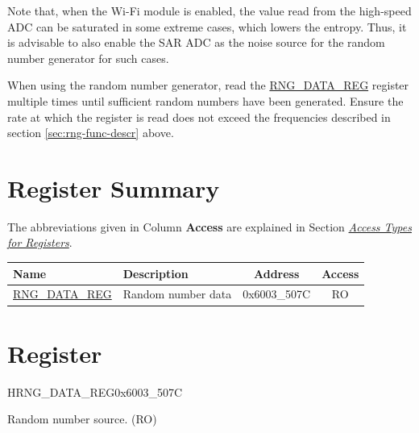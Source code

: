 \documentclass[main\_\_EN.tex]{subfiles}
\begin{document}
\begin{tiplisting}
Note that, when the Wi-Fi module is enabled, the value read from the high-speed ADC can be saturated in some extreme cases, which lowers the entropy. Thus, it is advisable to also enable the SAR ADC as the noise source for the random number generator for such cases.
\end{tiplisting}

When using the random number generator, read the \hyperref[regdesc:RNGDATAREG]{RNG\_DATA\_REG} register multiple times until sufficient random numbers have been generated. Ensure the rate at which the register is read does not exceed the frequencies described in section \ref{sec:rng-func-descr} above.

\section{Register Summary}\hypertarget{rng-reg-summ}{}

The abbreviations given in Column \textbf{Access} are explained in Section \hyperref[glossary-access-types]{\textit{Access Types for Registers}}.

\begin{table}[H]
    \centering
    \setlength{\extrarowheight}{0.3em}
    \begin{tabular}{ | l | l | c | c | }
    \hline
    \rowcolor{lightgray}
    \textbf{Name} & \textbf{Description} & \textbf{Address} & \textbf{Access} \\ \hline
    \hyperref[regdesc:RNGDATAREG]{RNG\_DATA\_REG} & Random number data & 0x6003\_507C & RO \\ \hline
    \end{tabular}
\end{table}

\section{Register}

\begin{register}{H}{RNG\_DATA\_REG}{0x6003\_507C}\label{regdesc:RNGDATAREG}
%
\regnewline%
\begin{regdesc}\begin{reglist}
\item [RNG\_DATA] Random number source. (RO)
\end{reglist}\end{regdesc}
\end{register}
\end{document}
